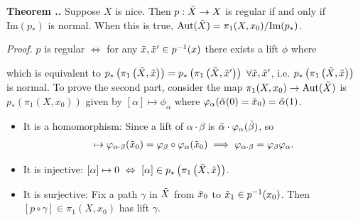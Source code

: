 \documentclass{natsirt}
\newcounter{thm}[section]
\newenvironment{thmbox}[1][]{
\begin{greenbox}[#1]\refstepcounter{thm}\textbf{Theorem \thesection.\thethm. }}{\end{greenbox}}
\begin{document}
\begin{thmbox}
    Suppose $X$ is nice. Then $p:\Tilde{X}\> X$ is regular if and only if $\text{Im}(p_*)$ is normal. When this is true, $\text{Aut}(\Tilde{X}) = \pi_1(X,x_0)/\text{Im}(p_*)$.
\end{thmbox}
\textit{Proof.} $p$ is regular $\iff$ for any $\Tilde{x}, \Tilde{x}'\in p^{-1}(x)$ there exists a lift $\phi$ where\begin{center}
    \end{center}
    which is equivalent to $p_*\pr{\pi_1\pr{\Tilde{X},\Tilde{x}}}=p_*\pr{\pi_1\pr{\Tilde{X},\Tilde{x}'}}\ \forall \Tilde{x},\Tilde{x}'$, i.e. $p_*\pr{\pi_1\pr{\Tilde{X},\Tilde{x}}}$ is normal. To prove the second part, consider the map $\pi_1(X,x_0)\> \text{Aut}(\Tilde{X})$ is $p_*(\pi_1(X,x_0))$ given by $[\alpha]\mapsto \phi_\alpha$ where $\phi_\alpha(\Tilde{\alpha}(0)=\Tilde{x}_0) = \Tilde{\alpha}(1)$.
    \begin{itemize}
        \item It is a homomorphism: Since a lift of $\alpha \cdot \beta$ is $\Tilde{\alpha}\cdot \phi_\alpha(\Tilde{\beta})$, so 
        \begin{align*}
            [\alpha][\beta] \mapsto \phi_{\alpha\cdot\beta}(\Tilde{x}_0) = \phi_\beta \circ \phi_\alpha(\Tilde{x}_0) \implies \phi_{\alpha\cdot \beta} = \phi_\beta \phi_\alpha.
        \end{align*}
        \item It is injective: $[\alpha]\mapsto 0 \iff [\alpha]\in p_*\pr{\pi_1\pr{\Tilde{X},\Tilde{x}}}$.
        \item It is surjective: Fix a path $\gamma$ in $\Tilde{X}$ from $\Tilde{x}_0$ to $\Tilde{x}_1\in p^{-1}(x_0)$. Then $[p\circ \gamma]\in\pi_1(X,x_0)$ has lift $\gamma$.\QED
    \end{itemize}
\end{document}
